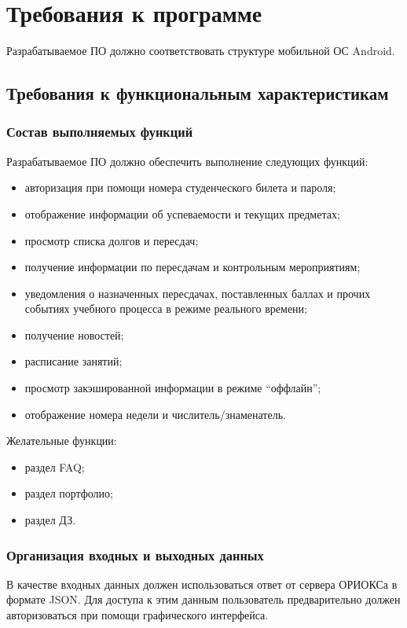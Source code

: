 \vspace{0.75cm}
\chapter{Требования к программе}
\label{ch:rqmts}
Разрабатываемое ПО должно соответствовать структуре мобильной ОС Android.

\section{Требования к функциональным характеристикам}
\label{sec:funcRqmts}

\subsection{Состав выполняемых функций}
\label{subsec:functions}

Разрабатываемое ПО должно обеспечить выполнение следующих функций:
\begin{itemize}
  \item авторизация при помощи номера студенческого билета и пароля;
  \item отображение информации об успеваемости и текущих предметах;
  \item просмотр списка долгов и пересдач;
  \item получение информации по пересдачам и контрольным мероприятиям;
  \item уведомления о назначенных пересдачах, поставленных баллах и прочих событиях учебного процесса в режиме реального времени;
  \item получение новостей;
  \item расписание занятий;
  \item просмотр закэшированной информации в режиме “оффлайн”;
  \item отображение номера недели и числитель/знаменатель.
\end{itemize}

Желательные функции:
\begin{itemize}
  \item раздел FAQ;
  \item раздел портфолио;
  \item раздел ДЗ.
\end{itemize}

\subsection{Организация входных и выходных данных}
\label{subsec:io}
В качестве входных данных должен использоваться ответ от сервера ОРИОКСа в формате JSON. Для доступа к этим данным пользователь предварительно должен авторизоваться при помощи графического интерфейса.

